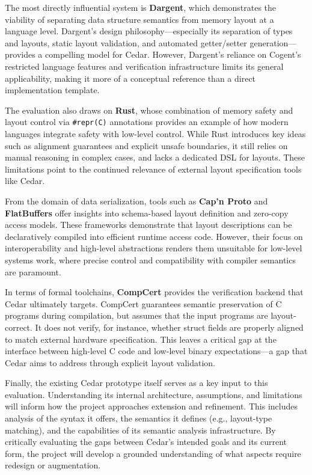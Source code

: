 \documentclass[12pt]{article}
\begin{document}
The most directly influential system is \textbf{Dargent}, which
demonstrates the viability of separating data structure semantics from memory
layout at a language level. Dargent's design philosophy---especially its
separation of types and layouts, static layout validation, and automated
getter/setter generation---provides a compelling model for Cedar. However,
Dargent's reliance on Cogent's restricted language features and verification
infrastructure limits its general applicability, making it more of a conceptual
reference than a direct implementation template.

The evaluation also draws on \textbf{Rust}, whose combination of memory
safety and layout control via \texttt{\#repr(C)} annotations provides an
example of how modern languages integrate safety with low-level control.
While Rust introduces key ideas such as alignment guarantees and explicit unsafe
boundaries, it still relies on manual reasoning in complex cases, and lacks a
dedicated DSL for layouts. These limitations point to the continued relevance
of external layout specification tools like Cedar.

From the domain of data serialization, tools such as \textbf{Cap'n Proto} and
\textbf{FlatBuffers} offer insights into schema-based layout definition and
zero-copy access models. These frameworks demonstrate that layout descriptions
can be declaratively compiled into efficient runtime access code. However, their
focus on interoperability and high-level abstractions renders them unsuitable for
low-level systems work, where precise control and compatibility with compiler
semantics are paramount.

In terms of formal toolchains, \textbf{CompCert} provides the verification
backend that Cedar ultimately targets. CompCert guarantees semantic preservation
of C programs during compilation, but assumes that the input programs are
layout-correct. It does not verify, for instance, whether struct fields
are properly aligned to match external hardware specification. This leaves a
critical gap at the interface between high-level C code and low-level binary
expectations---a gap that Cedar aims to address through explicit layout
validation.

Finally, the existing Cedar prototype itself serves as a key input to this
evaluation. Understanding its internal architecture, assumptions, and 
limitations will inform how the project approaches extension and refinement.
This includes analysis of the syntax it offers, the semantics it defines (e.g.,
layout-type matching), and the capabilities of its semantic analysis 
infrastructure. By critically evaluating the gaps between Cedar's intended goals
and its current form, the project will develop a grounded understanding of
what aspects require redesign or augmentation.
\end{document}
